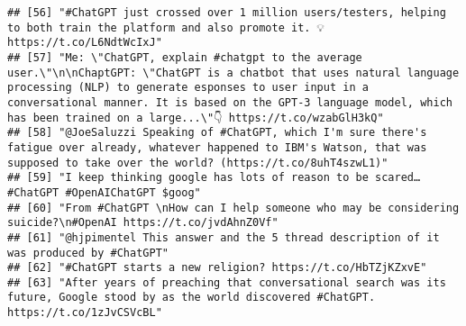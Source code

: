 \documentclass[
]{article}
\begin{document}
\begin{verbatim}
## [56] "#ChatGPT just crossed over 1 million users/testers, helping to both train the platform and also promote it. 💡 https://t.co/L6NdtWcIxJ"                                                                                                                                                                                         
## [57] "Me: \"ChatGPT, explain #chatgpt to the average user.\"\n\nChaptGPT: \"ChatGPT is a chatbot that uses natural language processing (NLP) to generate esponses to user input in a conversational manner. It is based on the GPT-3 language model, which has been trained on a large...\"👇 https://t.co/wzabGlH3kQ"                
## [58] "@JoeSaluzzi Speaking of #ChatGPT, which I'm sure there's fatigue over already, whatever happened to IBM's Watson, that was supposed to take over the world? (https://t.co/8uhT4szwL1)"                                                                                                                                          
## [59] "I keep thinking google has lots of reason to be scared… #ChatGPT #OpenAIChatGPT $goog"                                                                                                                                                                                                                                          
## [60] "From #ChatGPT \nHow can I help someone who may be considering suicide?\n#OpenAI https://t.co/jvdAhnZ0Vf"                                                                                                                                                                                                                        
## [61] "@hjpimentel This answer and the 5 thread description of it was produced by #ChatGPT"                                                                                                                                                                                                                                            
## [62] "#ChatGPT starts a new religion? https://t.co/HbTZjKZxvE"                                                                                                                                                                                                                                                                        
## [63] "After years of preaching that conversational search was its future, Google stood by as the world discovered #ChatGPT. https://t.co/1zJvCSVcBL"                                                                                                                                                                                  

\end{verbatim}
\end{document}
